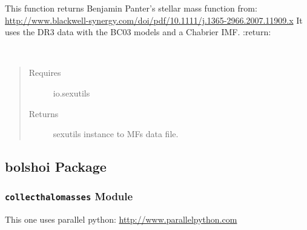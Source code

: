 \documentclass[letterpaper,10pt,english]{sphinxmanual}
\begin{document}

\begin{fulllineitems}
\label{SamPy.astronomy:SamPy.astronomy.stellarMFs.panter}
This function returns Benjamin Panter's stellar mass function from:
\href{http://www.blackwell-synergy.com/doi/pdf/10.1111/j.1365-2966.2007.11909.x}{http://www.blackwell-synergy.com/doi/pdf/10.1111/j.1365-2966.2007.11909.x}
It uses the DR3 data with the BC03 models and a Chabrier IMF.
:return:

\end{fulllineitems}



\begin{fulllineitems}
\label{SamPy.astronomy:SamPy.astronomy.stellarMFs.stellarMfs}~\begin{quote}\begin{description}
\item[{Requires }] \leavevmode
io.sexutils

\item[{Returns}] \leavevmode
sexutils instance to MFs data file.

\end{description}\end{quote}

\end{fulllineitems}



\subsection{bolshoi Package}
\label{SamPy.bolshoi:bolshoi-package}\label{SamPy.bolshoi::doc}

\subsubsection{\texttt{collecthalomasses} Module}
\label{SamPy.bolshoi:collecthalomasses-module}\label{SamPy.bolshoi:module-SamPy.bolshoi.collecthalomasses}
This one uses parallel python:
\href{http://www.parallelpython.com}{http://www.parallelpython.com}

\end{document}
